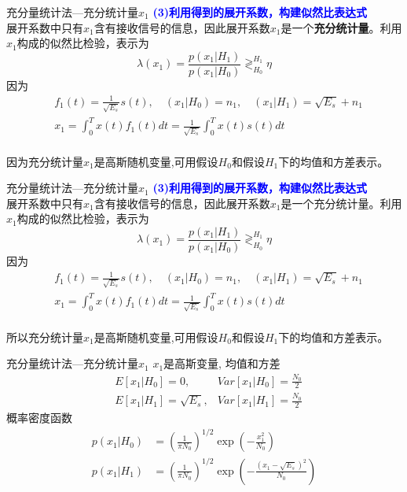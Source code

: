 \begin{frame}[shrink]{充分量统计法---充分统计量$x_1$}
\textbf{\textcolor{blue}{(3)利用得到的展开系数，构建似然比表达式
}}\\
展开系数中只有$x_1$含有接收信号的信息，因此展开系数$x_1$是一个\textbf{充分统计量}。利用$x_1$构成的似然比检验，表示为
\[\lambda(x_1)=\frac{p(x_1|H_1)}{p(x_1|H_0)}\mathop{\gtrless}_{H_0}^{H_1}\eta\]
因为
\begin{align*}
&f_1(t)=\frac{1}{\sqrt{E_s}}s(t),\quad (x_1|H_0)=n_1,\quad (x_1|H_1)=\sqrt{E_s}+n_1\\ &x_1=\int_{0}^{T}x(t)f_1(t)dt=\frac{1}{\sqrt{E_s}}\int_{0}^{T}x(t)s(t)dt
\end{align*}
~\\
因为充分统计量$x_1$是高斯随机变量,可用假设$H_0$和假设$H_1$下的均值和方差表示。
\end{frame}

\begin{frame}[shrink]{充分量统计法---充分统计量$x_1$}
\textbf{\textcolor{blue}{(3)利用得到的展开系数，构建似然比表达式
}}\\
展开系数中只有$x_1$含有接收信号的信息，因此展开系数$x_1$是一个充分统计量。利用$x_1$构成的似然比检验，表示为
\[\lambda(x_1)=\frac{p(x_1|H_1)}{p(x_1|H_0)}\mathop{\gtrless}_{H_0}^{H_1}\eta\]
因为
\begin{align*}
&f_1(t)=\frac{1}{\sqrt{E_s}}s(t),\quad (x_1|H_0)=n_1,\quad (x_1|H_1)=\sqrt{E_s}+n_1\\ &x_1=\int_{0}^{T}x(t)f_1(t)dt=\frac{1}{\sqrt{E_s}}\int_{0}^{T}x(t)s(t)dt
\end{align*}
~\\
所以充分统计量$x_1$是高斯随机变量,可用假设$H_0$和假设$H_1$下的均值和方差表示。
\end{frame}

\begin{frame}{充分量统计法---充分统计量$x_1$}
$x_1$是高斯变量, 均值和方差
\begin{align*}
&E[x_1|H_0]=0,&Var[x_1|H_0]=\frac{N_0}{2}\\
&E[x_1|H_1]=\sqrt{E_s},&Var[x_1|H_1]=\frac{N_0}{2}
\end{align*}
概率密度函数
\begin{align*}
p(x_1|H_0)&=\left(\frac{1}{\pi N_0}\right)^{1/2}\exp\left(-\frac{x_1^2}{N_0}\right)\\
p(x_1|H_1)&=\left(\frac{1}{\pi N_0}\right)^{1/2}\exp\left(-\frac{(x_1-\sqrt{E_s})^2}{N_0}\right)
\end{align*}
\end{frame}

